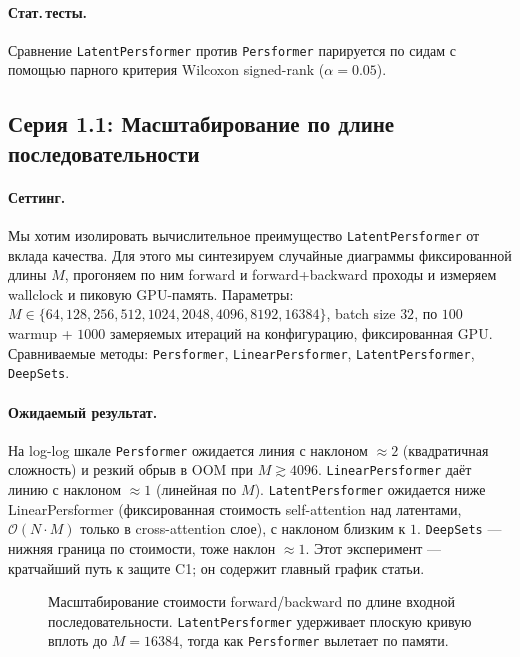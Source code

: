 \paragraph{Стат.\,тесты.} Сравнение \texttt{LatentPersformer} против \texttt{Persformer} парируется по сидам с помощью парного критерия Wilcoxon signed-rank ($\alpha = 0.05$).

\subsection{Серия 1.1: Масштабирование по длине последовательности}
\label{ssec:exp-scaling}

\paragraph{Сеттинг.} Мы хотим изолировать вычислительное преимущество \texttt{LatentPersformer} от вклада качества. Для этого мы синтезируем случайные диаграммы фиксированной длины $M$, прогоняем по ним forward и forward+backward проходы и измеряем wallclock и пиковую GPU-память. Параметры: $M \in \{64, 128, 256, 512, 1024, 2048, 4096, 8192, 16384\}$, batch size $32$, по $100$ warmup + $1000$ замеряемых итераций на конфигурацию, фиксированная GPU. Сравниваемые методы: \texttt{Persformer}, \texttt{LinearPersformer}, \texttt{LatentPersformer}, \texttt{DeepSets}.

\paragraph{Ожидаемый результат.} На log-log шкале \texttt{Persformer} ожидается линия с наклоном $\approx 2$ (квадратичная сложность) и резкий обрыв в OOM при $M \gtrsim 4096$. \texttt{LinearPersformer} даёт линию с наклоном $\approx 1$ (линейная по $M$). \texttt{LatentPersformer} ожидается ниже LinearPersformer (фиксированная стоимость self-attention над латентами, $\mathcal{O}(N \cdot M)$ только в cross-attention слое), с наклоном близким к $1$. \texttt{DeepSets} --- нижняя граница по стоимости, тоже наклон $\approx 1$. Этот эксперимент --- кратчайший путь к защите C1; он содержит главный график статьи.

\begin{figure}[ht]
\centering
{}
\caption{Масштабирование стоимости forward/backward по длине входной последовательности. \texttt{LatentPersformer} удерживает плоскую кривую вплоть до $M=16384$, тогда как \texttt{Persformer} вылетает по памяти.}
\label{fig:scaling-seqlen}
\end{figure}

